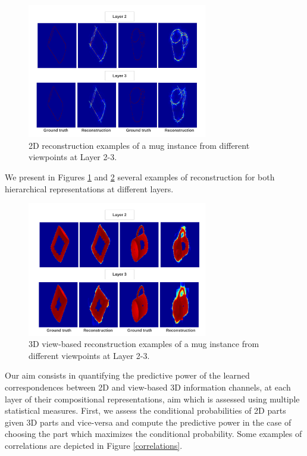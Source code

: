 \documentclass[runningheads]{llncs}
\begin{document}
\begin{figure}
\begin{center}
\includegraphics[width=0.7\textwidth]{reconstruction_edge}
\end{center}
\caption{2D reconstruction examples of a mug instance from different viewpoints at Layer 2-3.}
\label{reconstructionEdge}
\end{figure}

We present in Figures \ref{reconstructionEdge} and \ref{reconstructionDepth} several examples of reconstruction for both hierarchical representations at different layers. 

\begin{figure}
\begin{center}
\includegraphics[width=0.7\textwidth]{reconstruction_depth}
\end{center}
\caption{3D view-based reconstruction examples of a mug instance from different viewpoints at Layer 2-3.}
\label{reconstructionDepth}
\end{figure}

Our aim consists in quantifying the predictive power of the learned correspondences between 2D and view-based 3D information channels, at each layer of their compositional representations, aim which is assessed using multiple statistical measures. First, we assess the conditional probabilities of 2D parts given 3D parts and vice-versa and compute the predictive power in the case of choosing the part which maximizes the conditional probability. Some examples of correlations are depicted in Figure \ref{correlations}.
\end{document}
